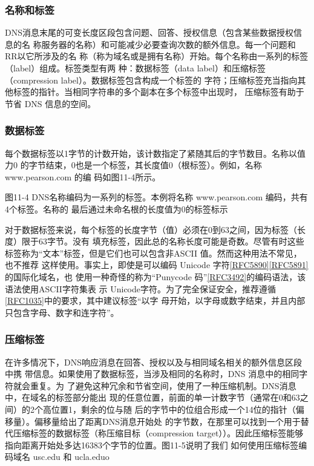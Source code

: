 \subsubsection{名称和标签}

DNS消息末尾的可变长度区段包含问题、回答、授权信息（包含某些数据授权信息的名
称服务器的名称）和可能减少必要查询次数的额外信息。每一个问题和 RR以它所涉及的名
称（称为域名或是拥有名称）开始。每个名称由一系列的标签（label）组成。标签类型有两
种：数据标签（data label）和压缩标签（compression label）。数据标签包含构成一个标签的
字符；压缩标签充当指向其他标签的指针。当相同字符串的多个副本在多个标签中出现时，
压缩标签有助于节省 DNS 信息的空间。

\subsubsection{数据标签}

每个数据标签以1字节的计数开始，该计数指定了紧随其后的字节数目。名称以值力0
的字节结束，0也是一个标签，其长度值0（根标签）。例如，名称www.pearson.com 的编
码如图11-4所示。

图11-4 DNS名称编码为一系列的标签。本例将名称
www.pearson.com 编码，共有4个标签。名称的
最后通过未命名根的长度值为0的标签标示

对于数据标签来说，每个标签的长度字节（值）必须在0到63之间，因为标签（长度）限于63字节。没有
填充标签，因此总的名称长度可能是奇数。尽管有时这些标签称为“文本”标签，但是它们也可以包含非ASCII
值。然而这种用法不常见，也不推荐
这样使用。事实上，即使是可以编码 Unicode 字符\href{https://www.rfc-editor.org/rfc/rfc5890}{[RFC5890]}\href{https://www.rfc-editor.org/rfc/rfc5891}{[RFC5891]}的国际化域名，也
使用一种奇怪的称为“Punycode 码”\href{https://www.rfc-editor.org/rfc/rfc3492}{[RFC3492]}的编码语法，该语法使用ASCII字符集表
示 Unicode字符。为了完全保证安全，推荐遵循\href{https://www.rfc-editor.org/rfc/rfc1035}{[RFC1035]}中的要求，其中建议标签“以字
母开始，以字母或数字结束，并且内部只包含字母、数字和连字符”。

\subsubsection{压缩标签}

在许多情况下，DNS响应消息在回答、授权以及与相同域名相关的额外信息区段中携
带信息。如果使用了数据标签，当涉及相同的名称时，DNS 消息中的相同字符就会重复。为
了避免这种冗余和节省空间，使用了一种压缩机制。DNS消息中，在域名的标签部分能出
现的任意位置，前面的单一计数字节（通常在0和63之间）的2个高位置1，剩余的位与随
后的字节中的位组合形成一个14位的指针（偏移量）。偏移量给出了距离DNS消息开始处
的字节数，在那里可以找到一个用于替代压缩标签的数据标签（称压缩目标（compression
target））。因此压缩标签能够指向距离开始处多达16383个字节的位置。图11-5说明了我们
如何使用压缩标签编码域名 usc.edu 和 ucla.eduo

